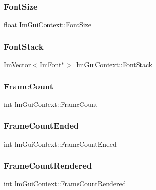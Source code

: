 \subsubsection{\texorpdfstring{Font\+Size}{FontSize}}
{\footnotesize\ttfamily float Im\+Gui\+Context\+::\+Font\+Size}

\hypertarget{struct_im_gui_context_a8a6a9f23604fe0d0b51c78e45e4432b0}{}\label{struct_im_gui_context_a8a6a9f23604fe0d0b51c78e45e4432b0} 
\subsubsection{\texorpdfstring{Font\+Stack}{FontStack}}
{\footnotesize\ttfamily \hyperlink{class_im_vector}{Im\+Vector}$<$\hyperlink{struct_im_font}{Im\+Font}$\ast$$>$ Im\+Gui\+Context\+::\+Font\+Stack}

\hypertarget{struct_im_gui_context_ab9a1f3b3f15f0a6c5f29aef85f1a8ea2}{}\label{struct_im_gui_context_ab9a1f3b3f15f0a6c5f29aef85f1a8ea2} 
\subsubsection{\texorpdfstring{Frame\+Count}{FrameCount}}
{\footnotesize\ttfamily int Im\+Gui\+Context\+::\+Frame\+Count}

\hypertarget{struct_im_gui_context_aa4cc3099c789be981d665c617b6d78a9}{}\label{struct_im_gui_context_aa4cc3099c789be981d665c617b6d78a9} 
\subsubsection{\texorpdfstring{Frame\+Count\+Ended}{FrameCountEnded}}
{\footnotesize\ttfamily int Im\+Gui\+Context\+::\+Frame\+Count\+Ended}

\hypertarget{struct_im_gui_context_a64a96ecd43f4b10c1fec8eb3fc9bff89}{}\label{struct_im_gui_context_a64a96ecd43f4b10c1fec8eb3fc9bff89} 
\subsubsection{\texorpdfstring{Frame\+Count\+Rendered}{FrameCountRendered}}
{\footnotesize\ttfamily int Im\+Gui\+Context\+::\+Frame\+Count\+Rendered}

